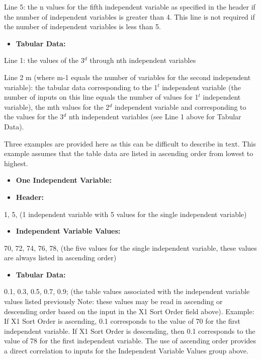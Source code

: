 Line 5: the n values for the fifth independent variable as specified in the header if the number of independent variables is greater than 4. This line is not required if the number of independent variables is less than 5.

\begin{itemize}
\tightlist
\item
  \textbf{Tabular Data:}
\end{itemize}

Line 1: the values of the 3\(^{d}\) through nth independent variables

Line 2 m (where m-1 equals the number of variables for the second independent variable): the tabular data corresponding to the 1\(^{t}\) independent variable (the number of inputs on this line equals the number of values for 1\(^{t}\) independent variable), the mth values for the 2\(^{d}\) independent variable and corresponding to the values for the 3\(^{d}\) nth independent variables (see Line 1 above for Tabular Data).

Three examples are provided here as this can be difficult to describe in text. This example assumes that the table data are listed in ascending order from lowest to highest.

\begin{itemize}
\item
  \textbf{One Independent Variable:}
\item
  \textbf{Header:}
\end{itemize}

1, 5, (1 independent variable with 5 values for the single independent variable)

\begin{itemize}
\tightlist
\item
  \textbf{Independent Variable Values:}
\end{itemize}

70, 72, 74, 76, 78, (the five values for the single independent variable, these values are always listed in ascending order)

\begin{itemize}
\tightlist
\item
  \textbf{Tabular Data:}
\end{itemize}

0.1, 0.3, 0.5, 0.7, 0.9; (the table values associated with the independent variable values listed previously Note: these values may be read in ascending or descending order based on the input in the X1 Sort Order field above). Example: If X1 Sort Order is ascending, 0.1 corresponds to the value of 70 for the first independent variable. If X1 Sort Order is descending, then 0.1 corresponds to the value of 78 for the first independent variable. The use of ascending order provides a direct correlation to inputs for the Independent Variable Values group above.

